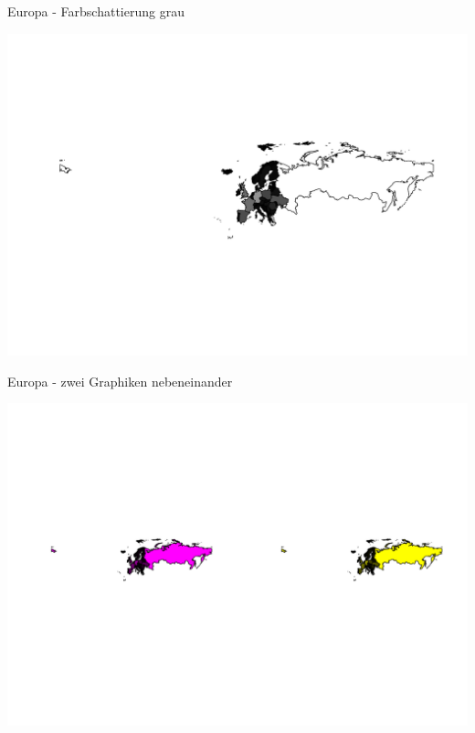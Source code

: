 \documentclass[ignorenonframetext,]{beamer}
\begin{document}
\begin{frame}{Europa - Farbschattierung grau}

\includegraphics{Geomedizin_files/figure-beamer/unnamed-chunk-103-1.pdf}

\end{frame}

\begin{frame}{Europa - zwei Graphiken nebeneinander}

\includegraphics{Geomedizin_files/figure-beamer/unnamed-chunk-104-1.pdf}

\end{frame}
\end{document}
